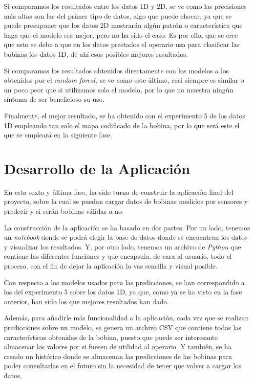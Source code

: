 Si comparamos los resultados entre los datos 1D y 2D, se ve como las precisiones más altas son las del primer tipo de datos, algo que puede chocar, ya que se puede presuponer que los datos 2D mostrarán algún patrón o característica que haga que el modelo sea mejor, pero no ha sido el caso. Es por ello, que se cree que esto se debe a que en los datos prestados el operario usa para clasificar las bobinas los datos 1D, de ahí esos posibles mejores resultados.

Si comparamos los resultados obtenidos directamente con los modelos a los obtenidos por el \emph{random forest}, se ve como este último, casi siempre es similar o un poco peor que si utilizamos solo el modelo, por lo que no muestra ningún síntoma de ser beneficioso su uso.

Finalmente, el mejor resultado, se ha obtenido con el experimento 5 de los datos 1D empleando tan solo el mapa codificado de la bobina, por lo que será este el que se empleará en la siguiente fase.

\section{Desarrollo de la Aplicación}
En esta sexta y última fase, ha sido turno de construir la aplicación final del proyecto, sobre la cual se puedan cargar datos de bobinas medidos por sensores y predecir y si serán bobinas válidas o no. 

La construcción de la aplicación se ha basado en dos partes. Por un lado, tenemos un \emph{notebook} donde se podrá elegir la base de datos donde se encuentran los datos y visualizar los resultados. Y, por otro lado, tenemos un archivo de \emph{Python} que contiene las diferentes funciones y que encapsula, de cara al usuario, todo el proceso, con el fin de dejar la aplicación lo vas sencilla y visual posible. 

Con respecto a los modelos usados para las predicciones, se han correspondido a los del experimento 5 sobre los datos 1D, ya que, como ya se ha visto en la fase anterior, han sido los que mejores resultados han dado. 

Además, para añadirle más funcionalidad a la aplicación, cada vez que se realizan predicciones sobre un modelo, se genera un archivo CSV que contiene todas las características obtenidas de la bobina, puesto que puede ser interesante almacenar los valores por si fuesen de utilidad al operario. Y también, se ha creado un histórico donde se almacenan las predicciones de las bobinas para poder consultarlas en el futuro sin la necesidad de tener que volver a cargar los datos.

